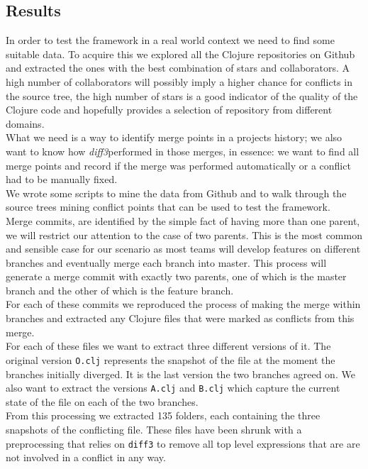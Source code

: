 \documentclass[11pt, titlepage]{article}
\newcommand{\diffthree}{\emph{diff3}}
\begin{document}
\subsection{Results}
In order to test the framework in a real world context we need to find some suitable data. To acquire this we explored all the Clojure repositories on Github and extracted the ones with the best combination of stars and collaborators. A high number of collaborators will possibly imply a higher chance for conflicts in the source tree, the high number of stars is a good indicator of the quality of the Clojure code and hopefully provides a selection of repository from different domains.
\\
What we need is a way to identify merge points in a projects history; we also want to know how \diffthree performed in those merges, in essence: we want to find all merge points and record if the merge was performed automatically or a conflict had to be manually fixed.
\\
We wrote some scripts to mine the data from Github and to walk through the source trees mining conflict points that can be used to test the framework. 
\\
Merge commits, are identified by the simple fact of having more than one parent, we will restrict our attention to the case of two parents. This is the most common and sensible case for our scenario as most teams will develop features on different branches and eventually merge each branch into master. 
This process will generate a merge commit with exactly two parents, one of which is the master branch and the other of which is the feature branch.
\\
For each of these commits we reproduced the process of making the merge within branches and extracted any Clojure files that were marked as conflicts from this merge.
\\
For each of these files we want to extract three different versions of it. The original version \texttt{O.clj} represents the snapshot of the file at the moment the branches initially diverged. It is the last version the two branches agreed on. We also want to extract the versions \texttt{A.clj} and \texttt{B.clj} which capture the current state of the file on each of the two branches.
\\
From this processing we extracted 135 folders, each containing the three snapshots of the conflicting file. These files have been shrunk with a preprocessing that relies on \texttt{diff3} to remove all  top level expressions that are are not involved in a conflict in any way.
\end{document}
